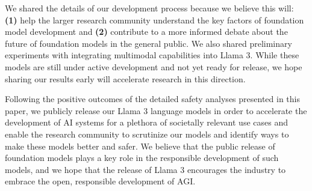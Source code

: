 We shared the details of our development process because we believe this will: \textbf{(1)} help the larger research community understand the key factors of foundation model development and \textbf{(2)} contribute to a more informed debate about the future of foundation models in the general public. We also shared preliminary experiments with integrating multimodal capabilities into Llama 3. While these models are still under active development and not yet ready for release, we hope sharing our results early will accelerate research in this direction.

Following the positive outcomes of the detailed safety analyses presented in this paper, we publicly release our Llama 3 language models in order to accelerate the development of AI systems for a plethora of societally relevant use cases and enable the research community to scrutinize our models and identify ways to make these models better and safer. We believe that the public release of foundation models plays a key role in the responsible development of such models, and we hope that the release of Llama 3 encourages the industry to embrace the open, responsible development of AGI.


